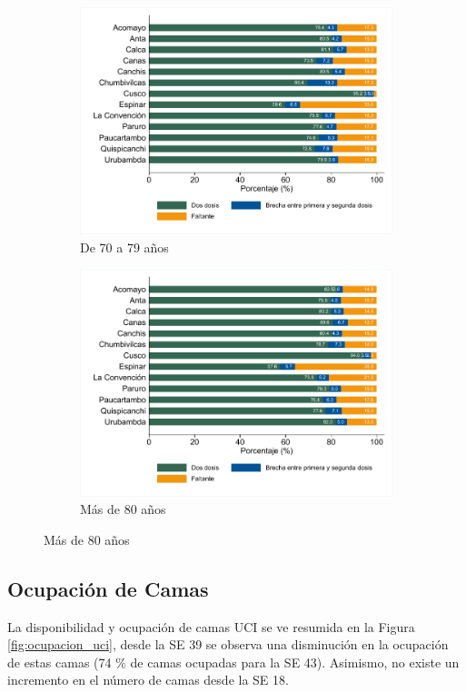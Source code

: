 \documentclass[12pt,a4paper,openany]{book}
\begin{document}
\begin{figure}[h]
\begin{subfigure}[b]{0.45\textwidth}
	\includegraphics[width=\textwidth]{../figuras/vacunacion_provincial_edad_6}
	\caption{De 70 a 79 años}
\end{subfigure}
\hfill
\begin{subfigure}[b]{0.45\textwidth}
	\centering
	\includegraphics[width=\textwidth]{../figuras/vacunacion_provincial_edad_7}
	\caption{Más de 80 años}
\end{subfigure}
\end{figure}

\clearpage
\subsection*{Ocupación de Camas}
\noindent La disponibilidad y ocupación de camas UCI se ve resumida en la Figura \ref{fig:ocupacion_uci}, desde la SE 39 se observa una disminución en la ocupación de estas camas (74 $\%$ de camas ocupadas para la SE 43). Asimismo, no existe un incremento en el número de camas desde la SE 18. 
\end{document}
